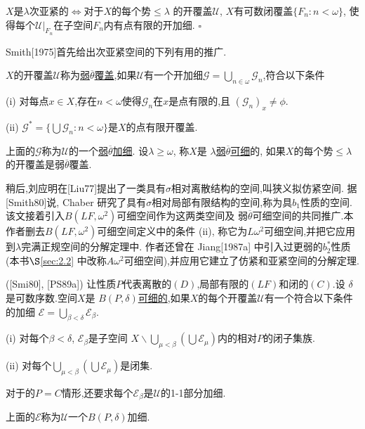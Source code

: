 \documentclass[main.tex]{subfiles}
\begin{document}
\begin{corollary}
$X$是$\lambda$次亚紧的$\Leftrightarrow$对于$X$的每个势$\le\lambda$
的开覆盖$\mathscr{U}$, $X$有可数闭覆盖$\{F_n:n<\omega\}$,
使得每个$\mathscr{U}|_{F_n}$在子空间$F_n$内有点有限的开加细. $\square$
\end{corollary}

Smith[1975]首先给出次亚紧空间的下列有用的推广.

\begin{definition}
$X$的开覆盖$\mathscr{U}$称为\underline{弱$\overline{\theta}$覆盖},如果$\mathscr{U}$有一个开加细$\mathscr{G}=\bigcup_{n\in\omega}\mathscr{G}_n$,符合以下条件

\textnormal{(i)} 对每点$x\in X$,存在$n<\omega$使得$\mathscr{G}_n$在$x$是点有限的,且
$(\mathscr{G}_n)_x \ne \phi$.

\textnormal{(ii)} $\mathscr{G}^* =\{\bigcup \mathscr{G}_n: n<\omega\}$是$X$的点有限开覆盖.

上面的$\mathscr{G}$称为$\mathscr{U}$的一个\underline{弱$\overline{\theta}$加细}.
设$\lambda\ge\omega$, 称$X$是 \underline{$\lambda$弱$\overline{\theta}$可细}的,
如果$X$的每个势$\le\lambda$的开覆盖是弱$\overline{\theta}$覆盖.
\end{definition}

稍后,刘应明在[Liu77]提出了一类具有$\sigma$相对离散结构的空间,叫狭义拟仿紧空间.
据[Smith80]说, Chaber 研究了具有$\sigma$相对局部有限结构的空间,称为具$b_1$性质的空间.
该文接着引入$B(LF,\omega^2)$可细空间作为这两类空间及
弱$\overline{\theta}$可细空间的共同推广.本作者删去$B(LF,\omega^2)$可细空间定义中的条件
 (ii), 称它为$L\omega^2$可细空间,并把它应用到$\lambda$完满正规空间的分解定理中.
 作者还曾在 Jiang[1987a] 中引入过更弱的$b_2^*$性质(本书$\S$\ref{sec:2.2} 中改称$A\omega^2$可细空间),并应用它建立了仿紧和亚紧空间的分解定理.

\begin{definition}\label{def1.2.3}
\textnormal{([Smi80], [PS89a])}	让性质$P$代表离散的$(D)$,局部有限的$(LF)$和闭的$(C)$.设
$\delta$是可数序数.空间$X$是
\underline{$B(P,\delta)$可细的},如果$X$的每个开覆盖$\mathscr{U}$有一个符合以下条件的加细
$\mathscr{E}=\bigcup_{\beta<\delta}\mathscr{E}_\beta$.

\textnormal{(i)} 对每个$\beta<\delta$, $\mathscr{E}_\beta$是子空间
$X\backslash\bigcup_{\mu<\beta}(\bigcup\mathscr{E}_\mu)$内的相对$P$的闭子集族.

\textnormal{(ii)} 对每个$\bigcup_{\mu<\beta}(\bigcup\mathscr{E}_\mu)$是闭集.

对于的$P=C$情形,还要求每个$\mathscr{E}_\beta$是$\mathscr{U}$的\textnormal{1-1}部分加细.

上面的$\mathscr{E}$称为$\mathscr{U}$一个$B(P,\delta)$加细.
\end{definition}
	
\end{document}
